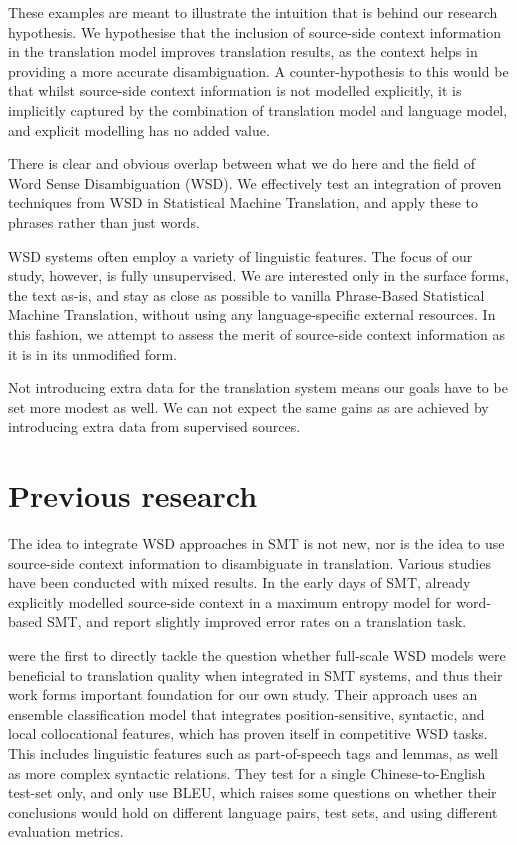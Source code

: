 \documentclass[11pt]{article}
\theoremstyle{break}
\begin{document}
These examples are meant to illustrate the intuition that is behind our
research hypothesis. We hypothesise that the inclusion of source-side context
information in the translation model improves translation results, as the
context helps in providing a more accurate disambiguation. A counter-hypothesis
to this would be that whilst source-side context information is not modelled
explicitly, it is implicitly captured by the combination of translation model
and language model, and explicit modelling has no added value.

There is clear and obvious overlap between what we do here and the field of
Word Sense Disambiguation (WSD). We effectively test an integration of proven
techniques from WSD in Statistical Machine Translation, and apply these to
phrases rather than just words.

WSD systems often employ a variety of linguistic features. The focus of our
study, however, is fully unsupervised. We are interested only in the surface
forms, the text as-is, and stay as close as possible to vanilla Phrase-Based
Statistical Machine Translation, without using any language-specific external
resources. In this fashion, we attempt to assess the merit of source-side
context information as it is in its unmodified form. 

Not introducing extra data for the translation system means our goals have to
be set more modest as well. We can not expect the same gains as are achieved by
introducing extra data from supervised sources.

\section{Previous research}

The idea to integrate WSD approaches in SMT is not new, nor is the idea to use
source-side context information to disambiguate in translation. Various studies
have been conducted with mixed results. In the early days of SMT,
\cite{GarciaVarea+02} already explicitly modelled source-side context in a
maximum entropy model for word-based SMT, and report slightly improved error
rates on a translation task.

\cite{CarpuatWu05} were the first to directly tackle the question whether
full-scale WSD models were beneficial to translation quality when integrated in
SMT systems, and thus their work forms important foundation for our own study.
Their approach uses an ensemble classification model that integrates
position-sensitive, syntactic, and local collocational features, which has
proven itself in competitive WSD tasks. This includes linguistic features such
as part-of-speech tags and lemmas, as well as more complex syntactic relations.
They test for a single Chinese-to-English test-set only, and only use BLEU,
which raises some questions on whether their conclusions would hold on
different language pairs, test sets, and using different evaluation metrics.
\end{document}
